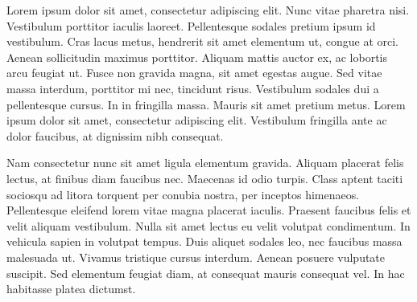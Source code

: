 \documentclass{icorsdssv2024}
\begin{document}






\mymaketitle



Lorem ipsum dolor sit amet, consectetur adipiscing elit. Nunc vitae pharetra nisi. Vestibulum porttitor iaculis laoreet. Pellentesque sodales pretium ipsum id vestibulum. Cras lacus metus, hendrerit sit amet elementum ut, congue at orci. Aenean sollicitudin maximus porttitor. Aliquam mattis auctor ex, ac lobortis arcu feugiat ut. Fusce non gravida magna, sit amet egestas augue. Sed vitae massa interdum, porttitor mi nec, tincidunt risus. Vestibulum sodales dui a pellentesque cursus. In in fringilla massa. Mauris sit amet pretium metus. Lorem ipsum dolor sit amet, consectetur adipiscing elit. Vestibulum fringilla ante ac dolor faucibus, at dignissim nibh consequat.

Nam consectetur nunc sit amet ligula elementum gravida. Aliquam placerat felis lectus, at finibus diam faucibus nec. Maecenas id odio turpis. Class aptent taciti sociosqu ad litora torquent per conubia nostra, per inceptos himenaeos. Pellentesque eleifend lorem vitae magna placerat iaculis. Praesent faucibus felis et velit aliquam vestibulum. Nulla sit amet lectus eu velit volutpat condimentum. In vehicula sapien in volutpat tempus. Duis aliquet sodales leo, nec faucibus massa malesuada ut. Vivamus tristique cursus interdum. Aenean posuere vulputate suscipit. Sed elementum feugiat diam, at consequat mauris consequat vel. In hac habitasse platea dictumst.
\end{document}
